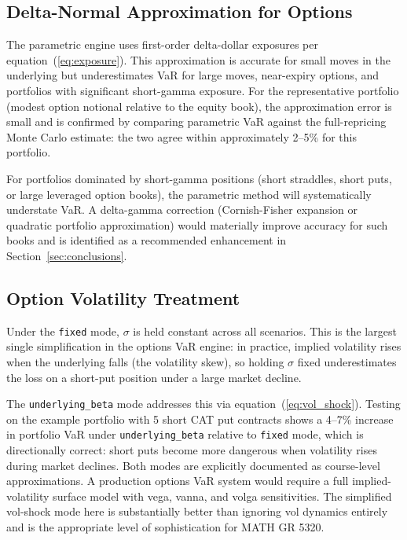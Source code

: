 \documentclass[11pt]{article}
\newcommand{\code}[1]{\texttt{#1}}
\begin{document}
\subsection{Delta-Normal Approximation for Options}

The parametric engine uses first-order delta-dollar exposures per
equation~(\ref{eq:exposure}).  This approximation is accurate for small moves
in the underlying but underestimates VaR for large moves, near-expiry options,
and portfolios with significant short-gamma exposure.  For the representative
portfolio (modest option notional relative to the equity book), the
approximation error is small and is confirmed by comparing parametric VaR
against the full-repricing Monte Carlo estimate: the two agree within
approximately 2--5\% for this portfolio.

For portfolios dominated by short-gamma positions (short straddles, short
puts, or large leveraged option books), the parametric method will
systematically understate VaR.  A delta-gamma correction (Cornish-Fisher
expansion or quadratic portfolio approximation) would materially improve
accuracy for such books and is identified as a recommended enhancement in
Section~\ref{sec:conclusions}.

\subsection{Option Volatility Treatment}

Under the \code{fixed} mode, $\sigma$ is held constant across all scenarios.
This is the largest single simplification in the options VaR engine: in
practice, implied volatility rises when the underlying falls (the volatility
skew), so holding $\sigma$ fixed underestimates the loss on a short-put position
under a large market decline.

The \code{underlying\_beta} mode addresses this via equation~(\ref{eq:vol_shock}).
Testing on the example portfolio with 5 short CAT put contracts shows a 4--7\%
increase in portfolio VaR under \code{underlying\_beta} relative to \code{fixed}
mode, which is directionally correct: short puts become more dangerous when
volatility rises during market declines.  Both modes are explicitly documented
as course-level approximations.  A production options VaR system would require
a full implied-volatility surface model with vega, vanna, and volga sensitivities.
The simplified vol-shock mode here is substantially better than ignoring vol
dynamics entirely and is the appropriate level of sophistication for MATH GR 5320.
\end{document}

